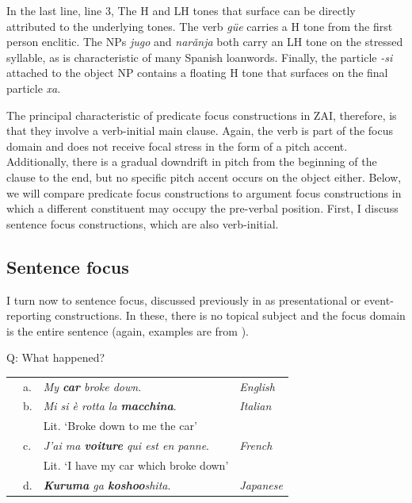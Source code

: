 In the last line, line 3, The H and LH tones that surface can be directly attributed to the underlying tones. The verb \textit{g\"{u}e} carries a H tone from the first person enclitic. The NPs \textit{jugo} and  \textit{nar\v{a}nja} both carry an LH tone on the stressed syllable, as is characteristic of many Spanish loanwords. Finally, the particle \textit{-si} attached to the object NP contains a floating H tone that surfaces on the final particle \textit{xa}. 

The principal characteristic of predicate focus constructions in ZAI, therefore, is that they involve a verb-initial main clause. Again, the verb is part of the focus domain and does not receive focal stress in the form of a pitch accent. Additionally, there is a gradual downdrift in pitch from the beginning of the clause to the end, but no specific pitch accent occurs on the object either. Below, we will compare predicate focus constructions to argument focus constructions in which a different constituent may occupy the pre-verbal position. First, I discuss sentence focus constructions, which are also verb-initial.



\subsection{Sentence focus}\label{sfsection}

I turn now to sentence focus, discussed previously in  as presentational or event-reporting constructions. In these, there is no topical subject and the focus domain is the entire sentence (again, examples are from \citet{lambrecht1994}). 


\ea\label{SF}
{Q: What happened?} \\
\begin{table}[H] 
\begin{tabular}{l l l l}
 & a. & \textit{My \textbf{car} broke down}. & \textit{English} \\
 & b. & \textit{Mi si \`{e} rotta la \textbf{macchina}}. & \textit{Italian}  \\
  & & Lit. `Broke down to me the car'  \\
 & c. & \textit{J'ai ma \textbf{voiture} qui est en panne}. & \textit{French}  \\
  & & Lit. `I have my car which broke down' \\
   & d. & \textit{\textbf{Kuruma} ga \textbf{koshoo}shita}. & \textit{Japanese}  \\
\end{tabular}
\end{table}
\z

